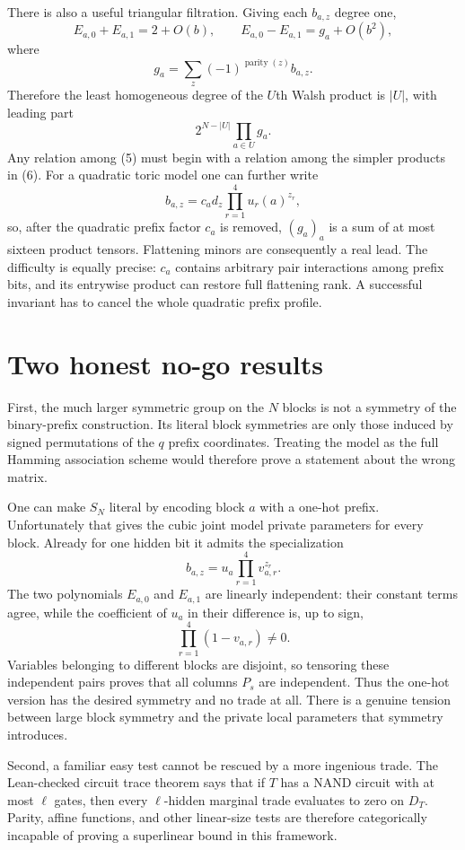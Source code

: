 \documentclass[11pt]{article}
\begin{document}
There is also a useful triangular filtration.  Giving each $b_{a,z}$ degree
one,
\[
 E_{a,0}+E_{a,1}=2+O(b),\qquad
 E_{a,0}-E_{a,1}=g_a+O(b^2),
\]
where
\[
 g_a=\sum_z(-1)^{\operatorname{parity}(z)}b_{a,z}.
\]
Therefore the least homogeneous degree of the $U$th Walsh product is $|U|$,
with leading part
\[
  2^{N-|U|}\prod_{a\in U}g_a.                  \tag{6}
\]
Any relation among (5) must begin with a relation among the simpler products
in (6).  For a quadratic toric model one can further write
\[
 b_{a,z}=c_a d_z\prod_{r=1}^4u_r(a)^{z_r},
\]
so, after the quadratic prefix factor $c_a$ is removed, $(g_a)_a$ is a sum
of at most sixteen product tensors.  Flattening minors are consequently a
real lead.  The difficulty is equally precise: $c_a$ contains arbitrary
pair interactions among prefix bits, and its entrywise product can restore
full flattening rank.  A successful invariant has to cancel the whole
quadratic prefix profile.

\section{Two honest no-go results}

First, the much larger symmetric group on the $N$ blocks is not a symmetry
of the binary-prefix construction.  Its literal block symmetries are only
those induced by signed permutations of the $q$ prefix coordinates.  Treating
the model as the full Hamming association scheme would therefore prove a
statement about the wrong matrix.

One can make $S_N$ literal by encoding block $a$ with a one-hot prefix.
Unfortunately that gives the cubic joint model private parameters for every
block.  Already for one hidden bit it admits the specialization
\[
 b_{a,z}=u_a\prod_{r=1}^4v_{a,r}^{z_r}.
\]
The two polynomials $E_{a,0}$ and $E_{a,1}$ are linearly independent: their
constant terms agree, while the coefficient of $u_a$ in their difference is,
up to sign,
\[
  \prod_{r=1}^4(1-v_{a,r})\ne0.
\]
Variables belonging to different blocks are disjoint, so tensoring these
independent pairs proves that all columns $P_s$ are independent.  Thus the
one-hot version has the desired symmetry and no trade at all.  There is a
genuine tension between large block symmetry and the private local parameters
that symmetry introduces.

Second, a familiar easy test cannot be rescued by a more ingenious trade.
The Lean-checked circuit trace theorem says that if $T$ has a NAND circuit
with at most $\ell$ gates, then every $\ell$-hidden marginal trade evaluates
to zero on $D_T$.  Parity, affine functions, and other linear-size tests are
therefore categorically incapable of proving a superlinear bound in this
framework.
\end{document}

